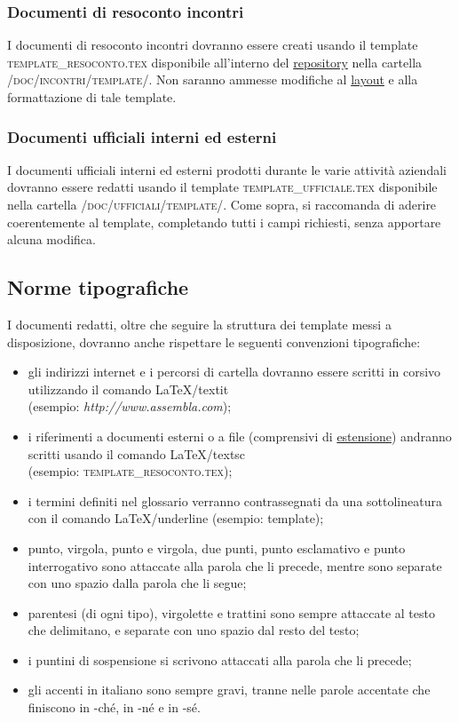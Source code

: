 \documentclass[11pt,a4paper]{article}
\begin{document}
\subsubsection{Documenti di resoconto incontri}
I documenti di resoconto incontri dovranno essere creati usando il template \textsc{template\_resoconto.tex} disponibile all'interno del \underline{repository} nella car\-tella \textsc{/doc/incontri/template/}. Non saranno ammesse modifiche al \underline{layout} e alla formattazione di tale template.
\subsubsection{Documenti ufficiali interni ed esterni}
I documenti ufficiali interni ed esterni prodotti durante le varie attività aziendali dovranno essere redatti usando il template \textsc{template\_ufficiale.tex} disponibile nella cartella \textsc{/doc/ufficiali/template/}.
Come sopra, si raccomanda di aderire coerentemente al template, completando tutti i campi richiesti, senza apportare alcuna modifica.
\subsection{Norme tipografiche}
I documenti redatti, oltre che seguire la struttura  dei template messi a disposizione, dovranno anche rispettare le seguenti convenzioni tipografiche:
\begin{itemize}
	\item gli indirizzi internet e i percorsi di cartella dovranno essere scritti in corsivo utilizzando il comando \LaTeX \space /textit
\\ (esempio: \textit{http://www.assembla.com});
	\item i riferimenti a documenti esterni o a file (comprensivi di \underline{estensione}) andranno scritti usando il comando \LaTeX \space /textsc
\\ (esempio: \textsc{template\_resoconto.tex});
	\item i termini definiti nel glossario verranno contrassegnati da una sottolineatura con il comando \LaTeX \space /underline (esempio: template);
	\item punto, virgola, punto e virgola, due punti, punto esclamativo e punto interrogativo sono attaccate alla parola che li precede, mentre sono separate con uno spazio dalla parola che li segue;
	\item parentesi (di ogni tipo), virgolette e trattini sono sempre attaccate al testo che delimitano, e separate con uno spazio dal resto del testo;
	\item i puntini di sospensione si scrivono attaccati alla parola che li precede;
	\item gli accenti in italiano sono sempre gravi, tranne nelle parole accentate che finiscono in -ché, in -né e in -sé.
\end{itemize}
\end{document}
